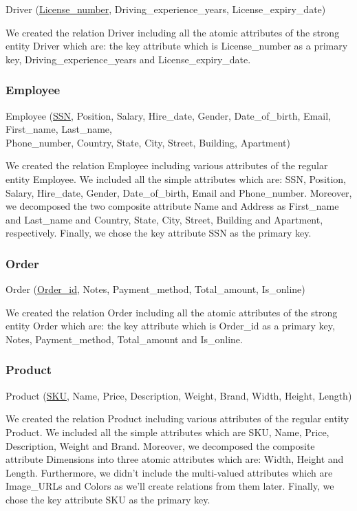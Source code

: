 Driver (\underline{License\_number}, Driving\_experience\_years, License\_expiry\_date)

We created the relation Driver including all the atomic attributes of the strong entity Driver which are: the key attribute which is License\_number as a primary key, Driving\_experience\_years and License\_expiry\_date.

\subsubsection{Employee}

Employee (\underline{SSN}, Position, Salary, Hire\_date, Gender, Date\_of\_birth, Email, First\_name, Last\_name, \\
Phone\_number, Country, State, City, Street, Building, Apartment)

We created the relation Employee including various attributes of the regular entity Employee. We included all the simple attributes which are: SSN, Position, Salary, Hire\_date, Gender, Date\_of\_birth, Email and Phone\_number. Moreover, we decomposed the two composite attribute Name and Address as First\_name and Last\_name and Country, State, City, Street, Building and Apartment, respectively. Finally, we chose the key attribute SSN as the primary key.

\subsubsection{Order}

Order (\underline{Order\_id}, Notes, Payment\_method, Total\_amount, Is\_online)

We created the relation Order including all the atomic attributes of the strong entity Order which are: the key attribute which is Order\_id as a primary key, Notes, Payment\_method, Total\_amount and Is\_online.

\subsubsection{Product}

Product (\underline{SKU}, Name, Price, Description, Weight, Brand, Width, Height, Length)

We created the relation Product including various attributes of the regular entity Product. We included all the simple attributes which are SKU, Name, Price, Description, Weight and Brand. Moreover, we decomposed the composite attribute Dimensions into three atomic attributes which are: Width, Height and Length. Furthermore, we didn't include the multi-valued attributes which are Image\_URLs and Colors as we'll create relations from them later. Finally, we chose the key attribute SKU as the primary key.

